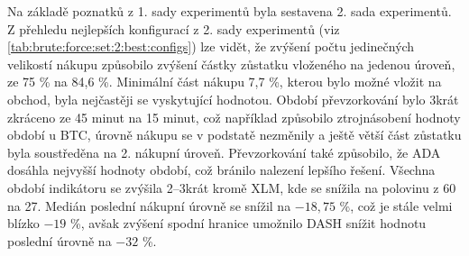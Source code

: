 Na základě poznatků z 1. sady experimentů byla sestavena 2. sada experimentů.
Z přehledu nejlepších konfigurací z 2. sady experimentů (viz \ref{tab:brute:force:set:2:best:configs}) lze vidět, že zvýšení počtu jedinečných velikostí nákupu způsobilo zvýšení částky zůstatku vloženého na jedenou úroveň, ze 75 \% na 84,6 \%.
Minimální část nákupu 7,7 \%, kterou bylo možné vložit na obchod, byla nejčastěji se vyskytující hodnotou.
Období převzorkování bylo 3krát zkráceno ze 45 minut na 15 minut, což například způsobilo ztrojnásobení hodnoty období u BTC, úrovně nákupu se v podstatě nezměnily a ještě větší část zůstatku byla soustředěna na 2. nákupní úroveň.
Převzorkování také způsobilo, že ADA dosáhla nejvyšší hodnoty období, což bránilo nalezení lepšího řešení.
Všechna období indikátoru se zvýšila 2--3krát kromě XLM, kde se snížila na polovinu z 60 na 27.
Medián poslední nákupní úrovně se snížil na \(-18,75\) \%, což je stále velmi blízko \(-19\) \%, avšak zvýšení spodní hranice umožnilo DASH snížit hodnotu poslední úrovně na \(-32\) \%.

